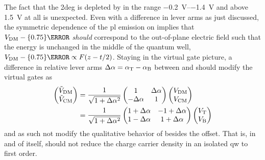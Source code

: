 The fact that the \gls{2deg} is depleted by \VDM in the range \qtyrange{-0.2}{-1.4}{\volt} and above \qty{1.5}{\volt} at all is unexpected.
Even with a difference in lever arms as just discussed, the symmetric dependence of the \gls{pl} emission on \VDM implies that $\VDM - \qty{0.75}{\volt}$ \emph{should} correspond to the out-of-plane electric field such that the energy is unchanged in the middle of the quantum well, $\VDM - \qty{0.75}{\volt} \propto F(z-t/2)$.
Staying in the virtual gate picture, a difference in relative lever arms
$\Delta\alpha = \alpha_{\mathrm{T}} - \alpha_{\mathrm{B}}$ between \VT and \VB should modify the virtual gates as
\begin{align}
    \begin{pmatrix}
        \tilde{V}_{\mathrm{DM}} \\
        \tilde{V}_{\mathrm{CM}}
    \end{pmatrix}
    &= \frac{1}{\sqrt{1 + \Delta\alpha^2}}\begin{pmatrix}
        1 & \Delta\alpha \\
        -\Delta\alpha & 1
    \end{pmatrix}\begin{pmatrix}
        V_{\mathrm{DM}} \\
        V_{\mathrm{CM}}
    \end{pmatrix} \\
    &= \frac{1}{\sqrt{1 + \Delta\alpha^2}}\begin{pmatrix}
        1 + \Delta\alpha & -1 + \Delta\alpha \\
         1 - \Delta\alpha & 1 + \Delta\alpha
    \end{pmatrix}\begin{pmatrix}
        V_{\mathrm{T}} \\
        V_{\mathrm{B}}
    \end{pmatrix}
\end{align}
and as such not modify the qualitative behavior of \VDM besides the offset.
That is, in and of itself, \VDM should not reduce the charge carrier density in an isolated \gls{qw} to first order.

